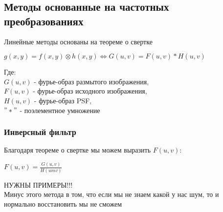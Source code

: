 \documentclass{article}
\begin{document}
	\subsection{Методы основанные на частотных преобразованиях}
	Линейные методы основаны на теореме о свертке
	\begin{center}
		$g(x, y) = f(x, y) \otimes h(x, y) \Leftrightarrow G(u, v)=F(u, v)*H(u, v)$
	\end{center}
	Где:\\
	$G(u, v)$ - фурье-образ размытого изображения,\\
	$F(u, v)$ - фурье-образ исходного изображения,\\
	$H(u, v)$ - фурье-образ PSF,\\
	$"*"$ - поэлементное умножение\\
	\subsubsection{Инверсный фильтр}
	Благодаря теореме о свертке мы можем выразить $F(u, v)$:
	\begin{center}
		$F(u, v)=\frac{G(u, v)}{H(um v)}$
	\end{center}
	НУЖНЫ ПРИМЕРЫ!!!\\
	Минус этого метода в том, что если мы не знаем какой у нас шум, то и нормально восстановить мы не сможем
\end{document}
